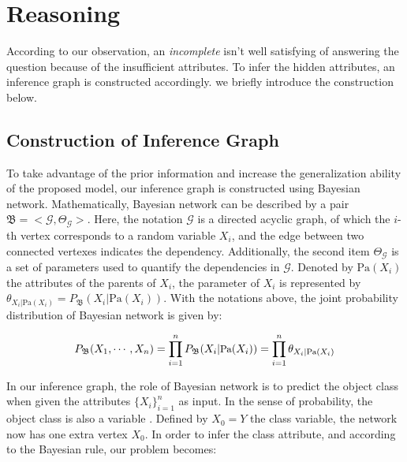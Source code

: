 \section{Reasoning}
\label{sec-reasoning}

According to our observation,  an {\em incomplete}  isn't well satisfying of answering the question because of the insufficient attributes.
To infer the hidden attributes, 
an inference graph is constructed accordingly.  
we briefly introduce the construction below. 

\subsection{Construction of Inference Graph}
To take advantage of the prior information and increase the generalization ability of the proposed model, our inference graph is constructed using Bayesian network.
Mathematically, Bayesian network \cite{friedman1997bayesian} can be described by a pair $\mathfrak{B}=<\mathcal{G},\varTheta_\mathcal{G}>$. 
Here, the notation $\mathcal{G}$ is a directed acyclic graph, of which the $i$-th vertex corresponds to a random variable $X_i$, and the edge between two connected vertexes indicates the dependency. 
Additionally, the second item $\varTheta_\mathcal{G}$ is a set of parameters used to quantify the dependencies in $\mathcal{G}$.
Denoted by $\text{Pa}(X_i)$ the attributes of the parents of $X_i$, 
the parameter of $X_i$ is represented by  $\theta_{X_i | \text{Pa}(X_i)} = P_\mathfrak{B}(X_i| \text{Pa}{(X_i)})$.
With the notations above, the joint probability distribution of Bayesian network is given by:

\begin{equation}\label{eq:BNOri}
\small
P_\mathfrak{B}(X_1, \cdots, X_n) = 
\prod_{i=1}^{n} P_\mathfrak{B}(X_i| \text{Pa}{(X_i)})=
\prod_{i=1}^{n} \theta_{X_i | \text{Pa}(X_i)}
\end{equation}
\vspace{-1ex}

In our inference graph, the role of Bayesian network is to predict the object class when given the attributes $\{X_i\}_{i=1}^n$ as input. In the sense of probability, the object class is also a variable \cite{koller2009probabilistic}.
Defined by $X_0=Y$ the class variable, the network now has one extra vertex $X_0$.
In order to infer the class attribute, and according to the Bayesian rule, our problem becomes:

